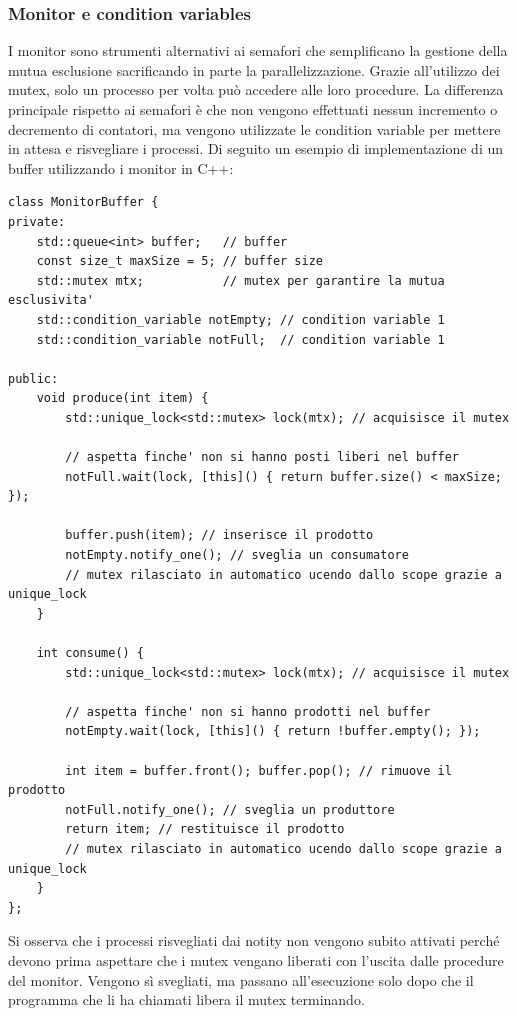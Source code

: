 \documentclass[a4paper]{article}
\begin{document}
\subsubsection*{Monitor e condition variables}
I monitor sono strumenti alternativi ai semafori che semplificano la gestione della mutua esclusione sacrificando in parte la
parallelizzazione. Grazie all'utilizzo dei mutex, solo un processo per volta può accedere alle loro procedure. La differenza
principale rispetto ai semafori è che non vengono effettuati nessun incremento o decremento di contatori, ma vengono utilizzate
le condition variable per mettere in attesa e risvegliare i processi. Di seguito un esempio di implementazione di un buffer
utilizzando i monitor in C++:
\begin{lstlisting}
class MonitorBuffer {
private:
	std::queue<int> buffer;   // buffer
	const size_t maxSize = 5; // buffer size
	std::mutex mtx;           // mutex per garantire la mutua esclusivita'
	std::condition_variable notEmpty; // condition variable 1
	std::condition_variable notFull;  // condition variable 1

public:
	void produce(int item) {
		std::unique_lock<std::mutex> lock(mtx); // acquisisce il mutex

		// aspetta finche' non si hanno posti liberi nel buffer
		notFull.wait(lock, [this]() { return buffer.size() < maxSize; });

		buffer.push(item); // inserisce il prodotto
		notEmpty.notify_one(); // sveglia un consumatore
		// mutex rilasciato in automatico ucendo dallo scope grazie a unique_lock
	}

	int consume() {
		std::unique_lock<std::mutex> lock(mtx); // acquisisce il mutex

		// aspetta finche' non si hanno prodotti nel buffer
		notEmpty.wait(lock, [this]() { return !buffer.empty(); });

		int item = buffer.front(); buffer.pop(); // rimuove il prodotto
		notFull.notify_one(); // sveglia un produttore
		return item; // restituisce il prodotto
		// mutex rilasciato in automatico ucendo dallo scope grazie a unique_lock
	}
};
\end{lstlisting}
Si osserva che i processi risvegliati dai notity non vengono subito attivati perché devono prima aspettare che i mutex vengano
liberati con l'uscita dalle procedure del monitor. Vengono sì svegliati, ma passano all'esecuzione solo dopo che il programma
che li ha chiamati libera il mutex terminando.
\end{document}
